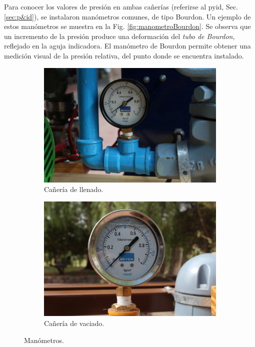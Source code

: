 Para conocer los valores de presión en ambas cañerías
(referirse al \gls{pyid}, Sec. \ref{sec:p&id}),
se instalaron manómetros comunes, de tipo Bourdon.
Un ejemplo de estos manómetros se muestra en la Fig. \ref{fig:manometroBourdon}.
Se observa que un incremento de la presión produce una deformación
del \emph{tubo de Bourdon}, reflejado en la aguja indicadora.
El manómetro de Bourdon permite obtener una medición visual de la
presión relativa, del punto donde se encuentra instalado.

\begin{figure}[t]
        \centering
        \begin{subfigure}[b]{0.48\textwidth}
\includegraphics[width=\textwidth]
	{Cap2-DisenoEnsamblado/images/manometro1.JPG}
	\caption{Cañería de llenado.}
        \end{subfigure}%
        \hfill
        \begin{subfigure}[b]{0.48\textwidth}
\includegraphics[width=\textwidth]
	{Cap2-DisenoEnsamblado/images/manometro2.JPG}
	\caption{Cañería de vaciado.}
        \end{subfigure}
        \caption{Manómetros.}
        \label{fig:manometro}
\end{figure}

